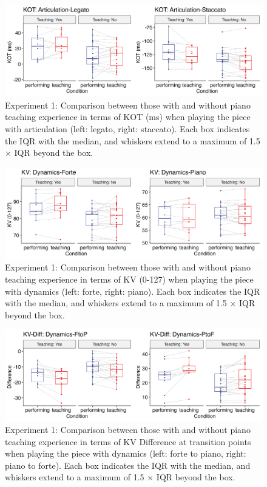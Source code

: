 \documentclass[
  man,floatsintext]{apa6}
\begin{document}
\begin{figure}
\includegraphics[width=1\linewidth]{manuscript_files/figure-latex/plot-art-teaching-1-1} \caption{\label{fig:art-teaching-1}Experiment 1: Comparison between those with and without piano teaching experience in terms of KOT (ms) when playing the piece with articulation (left: legato, right: staccato). Each box indicates the IQR with the median, and whiskers extend to a maximum of 1.5 × IQR beyond the box.}\label{fig:plot-art-teaching-1}
\end{figure}

\begin{figure}
\includegraphics[width=1\linewidth]{manuscript_files/figure-latex/plot-dyn-teaching-1-1} \caption{\label{fig:dyn-teaching-1}Experiment 1: Comparison between those with and without piano teaching experience in terms of KV (0-127) when playing the piece with dynamics (left: forte, right: piano). Each box indicates the IQR with the median, and whiskers extend to a maximum of 1.5 × IQR beyond the box.}\label{fig:plot-dyn-teaching-1}
\end{figure}

\begin{figure}
\includegraphics[width=1\linewidth]{manuscript_files/figure-latex/plot-dyn-diff-teaching-1-1} \caption{\label{fig:dyn-diff-teaching-1}Experiment 1: Comparison between those with and without piano teaching experience in terms of KV Difference at transition points when playing the piece with dynamics  (left: forte to piano, right: piano to forte). Each box indicates the IQR with the median, and whiskers extend to a maximum of 1.5 × IQR beyond the box.}\label{fig:plot-dyn-diff-teaching-1}
\end{figure}
\end{document}
